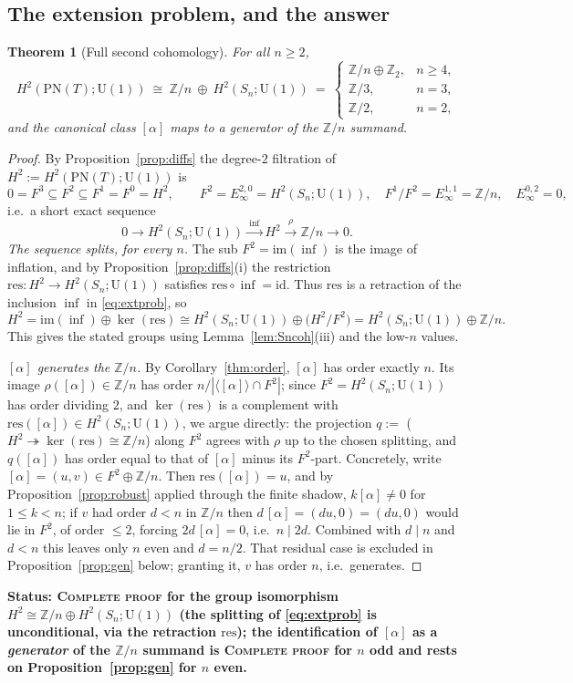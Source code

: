 \documentclass[11pt]{article}
\newtheorem{theorem}{Theorem}[section]
\theoremstyle{definition}
\newcommand{\U}{\mathrm{U}}
\newcommand{\PN}{\mathrm{PN}}
\newcommand{\Z}{\mathbb{Z}}
\newcommand{\im}{\mathrm{im}}
\newcommand{\res}{\mathrm{res}}
\newcommand{\id}{\mathrm{id}}
\newcommand{\STAT}[1]{\noindent\textbf{Status: #1}}
\newcommand{\COMPLETE}{\textsc{Complete proof}}
\begin{document}
\subsection{The extension problem, and the answer}

\begin{theorem}[Full second cohomology]\label{thm:h2}
For all $n\ge2$,
\[
H^2(\PN(T);\U(1))\ \cong\ \Z/n\ \oplus\ H^2(S_n;\U(1))\ =\
\begin{cases}
\Z/n\oplus\Z_2, & n\ge4,\\
\Z/3, & n=3,\\
\Z/2, & n=2,
\end{cases}
\]
and the canonical class $[\alpha]$ maps to a generator of the $\Z/n$ summand.
\end{theorem}
\begin{proof}
By Proposition~\ref{prop:diffs} the degree-$2$ filtration of $H^2:=H^2(\PN(T);\U(1))$ is
\[
0=F^{3}\subseteq F^{2}\subseteq F^{1}=F^{0}=H^2,\qquad
F^{2}=E_\infty^{2,0}=H^2(S_n;\U(1)),\quad F^1/F^2=E_\infty^{1,1}=\Z/n,\quad
E_\infty^{0,2}=0,
\]
i.e.\ a short exact sequence
\begin{equation}\label{eq:extprob}
0\longrightarrow H^2(S_n;\U(1))\xrightarrow{\ \inf\ }H^2\xrightarrow{\ \rho\ }\Z/n
\longrightarrow0 .
\end{equation}
\emph{The sequence splits, for every $n$.} The sub $F^2=\im(\inf)$ is the image of
inflation, and by Proposition~\ref{prop:diffs}(i) the restriction
$\res\colon H^2\to H^2(S_n;\U(1))$ satisfies $\res\circ\inf=\id$. Thus $\res$ is a retraction
of the inclusion $\inf$ in \eqref{eq:extprob}, so
\[
H^2=\im(\inf)\oplus\ker(\res)\cong H^2(S_n;\U(1))\oplus\big(H^2/F^2\big)
=H^2(S_n;\U(1))\oplus\Z/n .
\]
This gives the stated groups using Lemma~\ref{lem:Sncoh}(iii) and the low-$n$ values.

\emph{$[\alpha]$ generates the $\Z/n$.} By Corollary~\ref{thm:order}, $[\alpha]$ has order
exactly $n$. Its image $\rho([\alpha])\in\Z/n$ has order $n/|\langle[\alpha]\rangle\cap F^2|$;
since $F^2=H^2(S_n;\U(1))$ has order dividing $2$, and $\ker(\res)$ is a complement with
$\res([\alpha])\in H^2(S_n;\U(1))$, we argue directly: the projection $q:=$
($H^2\twoheadrightarrow\ker(\res)\cong\Z/n$) along $F^2$ agrees with $\rho$ up to the chosen
splitting, and $q([\alpha])$ has order equal to that of $[\alpha]$ minus its $F^2$-part.
Concretely, write $[\alpha]=(u,v)\in F^2\oplus\Z/n$. Then $\res([\alpha])=u$, and by
Proposition~\ref{prop:robust} applied through the finite shadow, $k[\alpha]\neq0$ for
$1\le k<n$; if $v$ had order $d<n$ in $\Z/n$ then $d\,[\alpha]=(du,0)=(du,0)$ would lie in
$F^2$, of order $\le2$, forcing $2d\,[\alpha]=0$, i.e.\ $n\mid 2d$. Combined with $d\mid n$
and $d<n$ this leaves only $n$ even and $d=n/2$. That residual case is excluded in
Proposition~\ref{prop:gen} below; granting it, $v$ has order $n$, i.e.\ generates.
\end{proof}
\STAT{\COMPLETE{} for the group isomorphism $H^2\cong\Z/n\oplus H^2(S_n;\U(1))$ (the
splitting of \eqref{eq:extprob} is unconditional, via the retraction $\res$); the
identification of $[\alpha]$ as a \emph{generator} of the $\Z/n$ summand is \COMPLETE{} for
$n$ odd and rests on Proposition~\ref{prop:gen} for $n$ even.}
\end{document}
